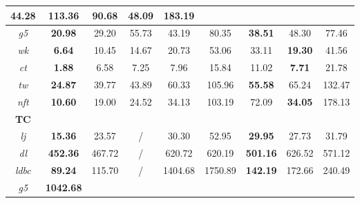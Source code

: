 \begin{table}[h!]
\begin{tabular}{|c|ccc|ccccc|}
  \multicolumn{1}{c|}{\textbf{44.28}} &
  \multicolumn{1}{c|}{113.36} &
  \multicolumn{1}{c|}{90.68} &
  \multicolumn{1}{c|}{48.09} &
  183.19 \\ \hline
\emph{g5} &
  \multicolumn{1}{c|}{\textbf{20.98}} &
  \multicolumn{1}{c|}{29.20} &
  55.73 &
  \multicolumn{1}{c|}{43.19} &
  \multicolumn{1}{c|}{80.35} &
  \multicolumn{1}{c|}{\textbf{38.51}} &
  \multicolumn{1}{c|}{48.30} &
  77.46 \\ \hline
\emph{wk} &
  \multicolumn{1}{c|}{\textbf{6.64}} &
  \multicolumn{1}{c|}{10.45} &
  14.67 &
  \multicolumn{1}{c|}{20.73} &
  \multicolumn{1}{c|}{53.06} &
  \multicolumn{1}{c|}{33.11} &
  \multicolumn{1}{c|}{\textbf{19.30}} &
  41.56 \\ \hline
\emph{ct} &
  \multicolumn{1}{c|}{\textbf{1.88}} &
  \multicolumn{1}{c|}{6.58} &
  7.25 &
  \multicolumn{1}{c|}{7.96} &
  \multicolumn{1}{c|}{15.84} &
  \multicolumn{1}{c|}{11.02} &
  \multicolumn{1}{c|}{\textbf{7.71}} &
  21.78 \\ \hline
\emph{tw} &
  \multicolumn{1}{c|}{\textbf{24.87}} &
  \multicolumn{1}{c|}{39.77} &
  43.89 &
  \multicolumn{1}{c|}{60.33} &
  \multicolumn{1}{c|}{105.96} &
  \multicolumn{1}{c|}{\textbf{55.58}} &
  \multicolumn{1}{c|}{65.24} &
  132.47 \\ \hline
\emph{nft} &
  \multicolumn{1}{c|}{\textbf{10.60}} &
  \multicolumn{1}{c|}{19.00} &
  24.52 &
  \multicolumn{1}{c|}{34.13} &
  \multicolumn{1}{c|}{103.19} &
  \multicolumn{1}{c|}{72.09} &
  \multicolumn{1}{c|}{\textbf{34.05}} &
  178.13 \\ \hline
\textbf{TC} &
   &
   &
   &
   &
   &
   &
   &
   \\ \hline
\emph{lj} &
  \multicolumn{1}{c|}{\textbf{15.36}} &
  \multicolumn{1}{c|}{23.57} &
  / &
  \multicolumn{1}{c|}{30.30} &
  \multicolumn{1}{c|}{52.95} &
  \multicolumn{1}{c|}{\textbf{29.95}} &
  \multicolumn{1}{c|}{27.73} &
  31.79 \\ \hline
\emph{dl} &
  \multicolumn{1}{c|}{\textbf{452.36}} &
  \multicolumn{1}{c|}{467.72} &
  / &
  \multicolumn{1}{c|}{620.72} &
  \multicolumn{1}{c|}{620.19} &
  \multicolumn{1}{c|}{\textbf{501.16}} &
  \multicolumn{1}{c|}{626.52} &
  571.12 \\ \hline
\emph{ldbc} &
  \multicolumn{1}{c|}{\textbf{89.24}} &
  \multicolumn{1}{c|}{115.70} &
  / &
  \multicolumn{1}{c|}{1404.68} &
  \multicolumn{1}{c|}{1750.89} &
  \multicolumn{1}{c|}{\textbf{142.19}} &
  \multicolumn{1}{c|}{172.66} &
  240.49 \\ \hline
\emph{g5} &
  \multicolumn{1}{c|}{\textbf{1042.68}} &

\end{tabular}
\end{table}
